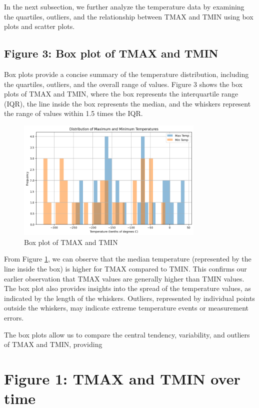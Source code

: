 \documentclass{article}
\begin{document}
In the next subsection, we further analyze the temperature data by examining the quartiles, outliers, and the relationship between TMAX and TMIN using box plots and scatter plots.

\subsection{Figure 3: Box plot of TMAX and TMIN}

Box plots provide a concise summary of the temperature distribution, including the quartiles, outliers, and the overall range of values. Figure 3 shows the box plots of TMAX and TMIN, where the box represents the interquartile range (IQR), the line inside the box represents the median, and the whiskers represent the range of values within 1.5 times the IQR.

\begin{figure}[h]
  \centering
  \includegraphics[width=0.8\textwidth]{figure_2.png}
  \caption{Box plot of TMAX and TMIN}
  \label{fig:temp_boxplot}
\end{figure}

From Figure \ref{fig:temp_boxplot}, we can observe that the median temperature (represented by the line inside the box) is higher for TMAX compared to TMIN. This confirms our earlier observation that TMAX values are generally higher than TMIN values. The box plot also provides insights into the spread of the temperature values, as indicated by the length of the whiskers. Outliers, represented by individual points outside the whiskers, may indicate extreme temperature events or measurement errors.

The box plots allow us to compare the central tendency, variability, and outliers of TMAX and TMIN, providing
\section{Figure 1: TMAX and TMIN over time}
\end{document}
